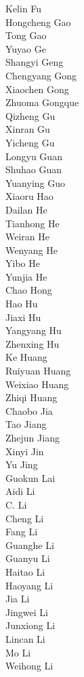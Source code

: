 Kelin Fu\\
Hongcheng Gao\\
Tong Gao\\
Yuyao Ge\\
Shangyi Geng\\
Chengyang Gong\\
Xiaochen Gong\\
Zhuoma Gongque\\
Qizheng Gu\\
Xinran Gu\\
Yicheng Gu\\
Longyu Guan\\
Shuhao Guan\\
Yuanying Guo\\
Xiaoru Hao\\
Dailan He\\
Tianhong He\\
Weiran He\\
Wenyang He\\
Yibo He\\
Yunjia He\\
Chao Hong\\
Hao Hu\\
Jiaxi Hu\\
Yangyang Hu\\
Zhenxing Hu\\
Ke Huang\\
Ruiyuan Huang\\
Weixiao Huang\\
Zhiqi Huang\\
Chaobo Jia\\
Tao Jiang\\
Zhejun Jiang\\
Xinyi Jin\\
Yu Jing\\
Guokun Lai\\
Aidi Li\\
C. Li\\
Cheng Li\\
Fang Li\\
Guanghe Li\\
Guanyu Li\\
Haitao Li\\
Haoyang Li\\
Jia Li\\
Jingwei Li\\
Junxiong Li\\
Lincan Li\\
Mo Li\\
Weihong Li\\
